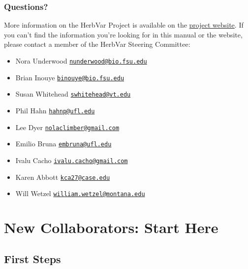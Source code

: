 \documentclass[
  letterpaper,
  DIV=11,
  numbers=noendperiod]{scrreprt}
\providecommand{\tightlist}{%
  \setlength{\itemsep}{0pt}\setlength{\parskip}{0pt}}\usepackage{longtable,booktabs,array}
\begin{document}
\section{Questions?}\label{questions}

More information on the HerbVar Project is available on the
\href{https://herbvar.org/}{project website}. If you can't find the
information you're looking for in this manual or the website, please
contact a member of the HerbVar Steering Committee:

\begin{itemize}
\tightlist
\item
  Nora Underwood
  \href{mailto:nunderwood@bio.fsu.edu}{\nolinkurl{nunderwood@bio.fsu.edu}}\\
\item
  Brian Inouye
  \href{mailto:binouye@bio.fsu.edu}{\nolinkurl{binouye@bio.fsu.edu}}\\
\item
  Susan Whitehead
  \href{mailto:swhitehead@vt.edu}{\nolinkurl{swhitehead@vt.edu}}\\
\item
  Phil Hahn \href{mailto:hahnp@ufl.edu}{\nolinkurl{hahnp@ufl.edu}}\\
\item
  Lee Dyer
  \href{mailto:nolaclimber@gmail.com}{\nolinkurl{nolaclimber@gmail.com}}\\
\item
  Emilio Bruna
  \href{mailto:embruna@ufl.edu}{\nolinkurl{embruna@ufl.edu}}\\
\item
  Ivalu Cacho
  \href{mailto:ivalu.cacho@gmail.com}{\nolinkurl{ivalu.cacho@gmail.com}}\\
\item
  Karen Abbott
  \href{mailto:kca27@case.edu}{\nolinkurl{kca27@case.edu}}\\
\item
  Will Wetzel
  \href{mailto:william.wetzel@montana.edu}{\nolinkurl{william.wetzel@montana.edu}}
\end{itemize}

\part{New Collaborators: Start Here}

\chapter{First Steps}\label{first-steps}
\end{document}
